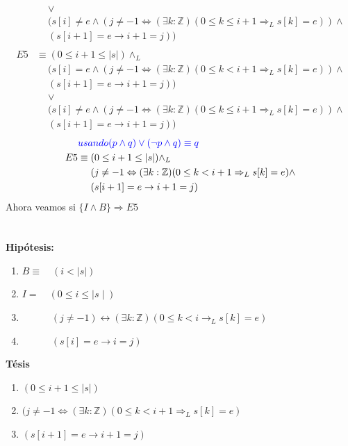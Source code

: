 \documentclass[12pt]{book}
\begin{document}
\begin{align*}
& \quad \   \lor \\  
& \quad \ (s[i] \neq e \land ( j\neq -1 \Leftrightarrow (\exists k: \mathbb{Z}) ( 0 \leq k \leq i + 1 \Rightarrow_L s[k] = e)) \wedge \\
& \quad \  (s[i+1] = e \rightarrow i+1 = j) )\\ \\
E5 &\equiv ( 0\leq i +1 \leq|s|) \land_L  \\
& \quad \ ( s[i] = e \land ( j \neq -1 \Leftrightarrow (\exists k: \mathbb{Z}) ( 0 \leq k < i + 1 \Rightarrow_L s[k] = e)) \wedge \\
& \quad \  (s[i+1] = e \rightarrow i+1 = j ) )\\
& \quad \   \lor \\  
& \quad \ (s[i] \neq e \land ( j\neq -1 \Leftrightarrow (\exists k: \mathbb{Z}) ( 0 \leq k \leq i + 1 \Rightarrow_L s[k] = e)) \wedge \\
& \quad \  (s[i+1] = e \rightarrow i+1 = j) )
\end{align*}
\begin{align*}
& \textcolor{blue}{ usando (p \wedge q )\vee(\neg p \wedge q ) \equiv q } \\
E5 &\equiv ( 0\leq i +1 \leq|s|) \land_L \\
& \quad \  (j\neq -1 \Leftrightarrow (\exists k: \mathbb{Z}) ( 0 \leq k < i + 1 \Rightarrow_L s[k] = e) \wedge \\
& \quad \  (s[i+1] = e \rightarrow i+1 = j) 
\end{align*}
Ahora veamos si $ \{I \land B \} \Rightarrow E5 $ \\ \\ \\
\textbf{Hip\'otesis:}
\begin{enumerate}
\item $ B \equiv \quad  (i < |s|) $
\item $ I = \quad (0 \leq i \leq  \mid s \mid) $
\item $ \qquad \quad (j \neq -1) \leftrightarrow (\exists k : \mathbb{Z})(0 \leq k < i \rightarrow_L s[k] = e) $
\item $ \qquad \quad  (s[i] = e \rightarrow i = j)$
\end{enumerate}
\textbf{T\'esis}
\begin{enumerate}
\item $ ( 0\leq i +1 \leq|s|) $
\item $ (j\neq -1 \Leftrightarrow (\exists k: \mathbb{Z}) ( 0 \leq k < i + 1 \Rightarrow_L s[k] = e)$
\item $ (s[i+1] = e \rightarrow i+1 = j) $
\end{enumerate}
\end{document}

